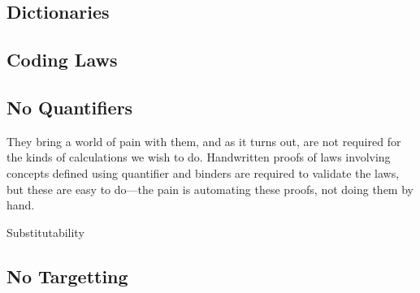 \subsection{Dictionaries}\label{ssec:dict}

\subsection{Coding Laws}\label{ssec:coding-laws}

\subsection{No Quantifiers}\label{ssec:no-quant}

    They bring a world of pain with them,
    and as it turns out, are not required
    for the kinds of calculations we wish to do.
    Handwritten proofs of laws involving concepts
    defined using quantifier and binders
    are required to validate the laws,
    but these are easy to do---the pain is automating these proofs,
    not doing them by hand.

    Substitutability

\subsection{No Targetting}\label{ssec:no-target}
